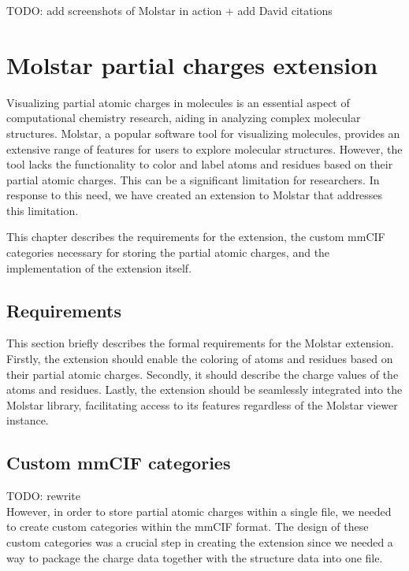 \documentclass[
  digital,     %
  oneside,     %
  nosansbold,  %
  nocolorbold, %
  lof,         %
  lot,         %
]{fithesis4}
\begin{document}
TODO: add screenshots of Molstar in action + add David citations


\chapter{Molstar partial charges extension}

Visualizing partial atomic charges in molecules is an essential aspect of computational chemistry research, aiding in analyzing complex molecular structures. Molstar, a popular software tool for visualizing molecules, provides an extensive range of features for users to explore molecular structures. However, the tool lacks the functionality to color and label atoms and residues based on their partial atomic charges. This can be a significant limitation for researchers. In response to this need, we have created an extension to Molstar that addresses this limitation.

This chapter describes the requirements for the extension, the custom mmCIF categories necessary for storing the partial atomic charges, and the implementation of the extension itself.

\section{Requirements}

This section briefly describes the formal requirements for the Molstar extension. Firstly, the extension should enable the coloring of atoms and residues based on their partial atomic charges. Secondly, it should describe the charge values of the atoms and residues. Lastly, the extension should be seamlessly integrated into the Molstar library, facilitating access to its features regardless of the Molstar viewer instance.

\section{Custom mmCIF categories}

TODO: rewrite \\

However, in order to store partial atomic charges within a single file, we needed to create custom categories within the mmCIF format.
The design of these custom categories was a crucial step in creating the extension since we needed a way to package the charge data together with the structure data into one file.
\end{document}
